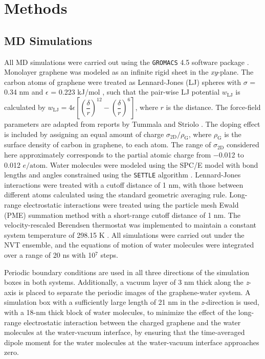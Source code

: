 \section{Methods}
\label{sec:wet-methods}

\subsection{MD Simulations}
\label{sec:wet-md-simulations}


All MD simulations were carried out
using the \texttt{GROMACS} 4.5 software package
\cite{Hess_2008_gromacs}. Monolayer graphene was modeled as an
infinite rigid sheet in the \textit{xy}-plane.
%
The carbon atoms of graphene
were treated as Lennard-Jones (LJ) spheres with
\(\sigma\) =
0.34 nm and \(\epsilon\) = 0.223 kJ/mol \cite{Cheng_1990}, such that the pair-wise LJ potential $w_{\mathrm{LJ}}$ is calculated by $w_{\mathrm{LJ}} = 4 \epsilon\left[\left(\dfrac{\delta}{r}\right)^{12} - \left(\dfrac{\delta}{r}\right)^{6}\right]$, where $r$ is the distance.
The 
force-field parameters are adapted from reports by Tummala and Striolo
\cite{Tummala_2008_counterion_SDS}.
%
The doping effect is included by assigning an equal amount of charge
\(\sigma_{\mathrm{2D}} / \rho_{\mathrm{G}}\), where
\(\rho_{\mathrm{G}}\) is the surface density of carbon in graphene, to
each atom.
%
The range of \(\sigma_{\mathrm{2D}}\) considered here
approximately corresponds to the partial atomic charge from −0.012 to
0.012 \(e/\mathrm{atom}\).
%
Water molecules were modeled using the SPC/E model
\cite{Berendsen_1987_pair} with bond lengths and angles constrained
using the \texttt{SETTLE} algorithm
\cite{Miyamoto_1992_SHAKE_RATTLE}. Lennard-Jones interactions were
treated with a cutoff distance of 1 nm, with those between different
atoms calculated using the standard geometric averaging
rule. Long-range electrostatic interactions were treated using the
particle mesh Ewald (PME) summation method
\cite{Darden_1993_ewald,Essmann_1995_ewald} with a short-range cutoff
distance of 1 nm. The velocity-rescaled Berendsen thermostat was
implemented to maintain a constant system temperature of 298.15 K
\cite{Bussi_2007}. All simulations were carried out under the NVT
ensemble, and the equations of motion of water molecules were
integrated over a range of 20 ns with 10\(^{\text{7}}\) steps.

Periodic boundary conditions are used in all three directions of the
simulation boxes in both systems. Additionally, a vacuum layer of 3 nm
thick along the \emph{z}-axis is placed to separate the periodic
images of the graphene-water system. A simulation box with a
sufficiently large length of 21 nm in the \emph{z}-direction is used,
with a 18-nm thick block of water molecules, to minimize the effect of
the long-range electrostatic interaction between the charged graphene
and the water molecules at the water-vacuum interface, by ensuring
that the time-averaged dipole moment for the water molecules at the
water-vacuum interface approaches zero.





